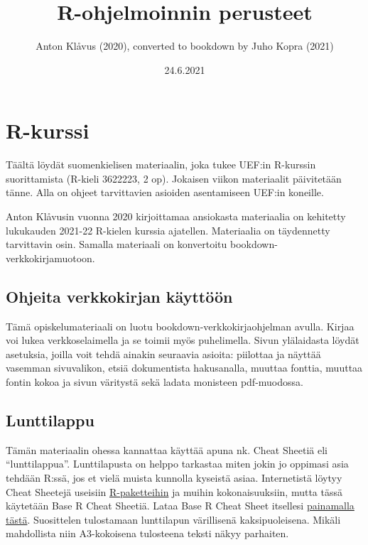 \documentclass[
]{book}
\title{R-ohjelmoinnin perusteet}
\author{Anton Klåvus (2020), converted to bookdown by Juho Kopra (2021)}
\date{24.6.2021}
\begin{document}
\maketitle

{
\setcounter{tocdepth}{1}
\tableofcontents
}
\hypertarget{r-kurssi}{%
\chapter*{R-kurssi}\label{r-kurssi}}

Täältä löydät suomenkielisen materiaalin, joka tukee UEF:in R-kurssin suorittamista (R-kieli 3622223, 2 op). Jokaisen viikon materiaalit päivitetään tänne. Alla on ohjeet tarvittavien asioiden asentamiseen UEF:in koneille.

Anton Klåvusin vuonna 2020 kirjoittamaa ansiokasta materiaalia on kehitetty lukukauden 2021-22 R-kielen kurssia ajatellen. Materiaalia on täydennetty tarvittavin osin. Samalla materiaali on konvertoitu bookdown-verkkokirjamuotoon.

\hypertarget{ohjeita-verkkokirjan-kuxe4yttuxf6uxf6n}{%
\section*{Ohjeita verkkokirjan käyttöön}\label{ohjeita-verkkokirjan-kuxe4yttuxf6uxf6n}}

Tämä opiskelumateriaali on luotu bookdown-verkkokirjaohjelman avulla. Kirjaa voi lukea verkkoselaimella ja se toimii myös puhelimella. Sivun ylälaidasta löydät asetuksia, joilla voit tehdä ainakin seuraavia asioita: piilottaa ja näyttää vasemman sivuvalikon, etsiä dokumentista hakusanalla, muuttaa fonttia, muuttaa fontin kokoa ja sivun väritystä sekä ladata monisteen pdf-muodossa.

\hypertarget{lunttilappu}{%
\section*{Lunttilappu}\label{lunttilappu}}

Tämän materiaalin ohessa kannattaa käyttää apuna nk. Cheat Sheetiä eli ``lunttilappua''. Lunttilapusta on helppo tarkastaa miten jokin jo oppimasi asia tehdään R:ssä, jos et vielä muista kunnolla kyseistä asiaa. Internetistä löytyy Cheat Sheetejä useisiin \href{https://www.rstudio.com/resources/cheatsheets/}{R-paketteihin} ja muihin kokonaisuuksiin, mutta tässä käytetään Base R Cheat Sheetiä. Lataa Base R Cheat Sheet itsellesi \href{files/base_R_cheat_sheet.pdf}{painamalla tästä}. Suosittelen tulostamaan lunttilapun värillisenä kaksipuoleisena. Mikäli mahdollista niin A3-kokoisena tulosteena teksti näkyy parhaiten.
\end{document}
